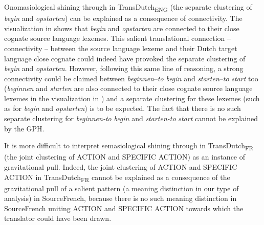 Onomasiological shining through in TransDutch\textsubscript{ENG} (the separate clustering of \textit{begin} and \textit{opstarten}) can be explained as a consequence of connectivity. The visualization in  shows that \textit{begin} and \textit{opstarten} are connected to their close cognate source language lexemes. This salient translational connection – connectivity – between the source language lexeme and their Dutch target language close cognate could indeed have provoked the separate clustering of \textit{begin} and \textit{opstarten}. However, following this same line of reasoning, a strong connectivity could be claimed between \textit{beginnen}–\textit{to} \textit{begin} and \textit{starten}–\textit{to} \textit{start} too (\textit{beginnen} and \textit{starten} are also connected to their close cognate source language lexemes in the visualization in ) and a separate clustering for these lexemes (such as for \textit{begin} and \textit{opstarten}) is to be expected. The fact that there is no such separate clustering for \textit{beginnen-to} \textit{begin} and \textit{starten-to} \textit{start} cannot be explained by the GPH.

It is more difficult to interpret semasiological shining through in TransDutch\textsubscript{FR} (the joint clustering of ACTION and SPECIFIC ACTION) as an instance of gravitational pull. Indeed, the joint clustering of ACTION and SPECIFIC ACTION in TransDutch\textsubscript{FR} cannot be explained as a consequence of the gravitational pull of a salient pattern (a meaning distinction in our type of analysis) in SourceFrench, because there is no such meaning distinction in SourceFrench uniting ACTION and SPECIFIC ACTION towards which the translator could have been drawn.

